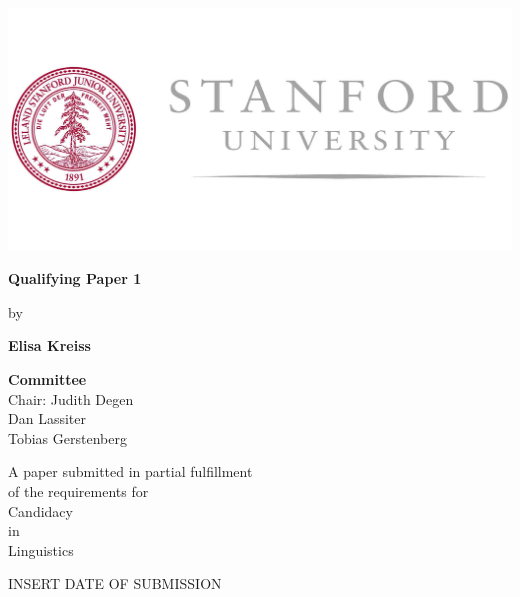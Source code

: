 \documentclass[a4paper]{article}
\begin{document}
	\begin{titlepage}
		\begin{center}
			\includegraphics[width=.8\textwidth]{../img/stanford_logo.jpg}
			
			\LARGE
			\textbf{Qualifying Paper 1}
			
			\vspace{1cm}
			by
			
			\vspace{1cm}
			
			\textbf{Elisa Kreiss}
			
			\vspace{2cm}
			
			\large
			
			\textbf{Committee}\\
			Chair: Judith Degen\\
			Dan Lassiter\\
			Tobias Gerstenberg\\
			
			\vfill

			A paper submitted in partial fulfillment\\
			of the requirements for\\
			Candidacy\\
			in\\
			Linguistics\\
			
			\vspace{0.8cm}
			
			INSERT DATE OF SUBMISSION\\
			
			\vspace{1cm}
			
			
		\end{center}
	\end{titlepage}
\end{document}
